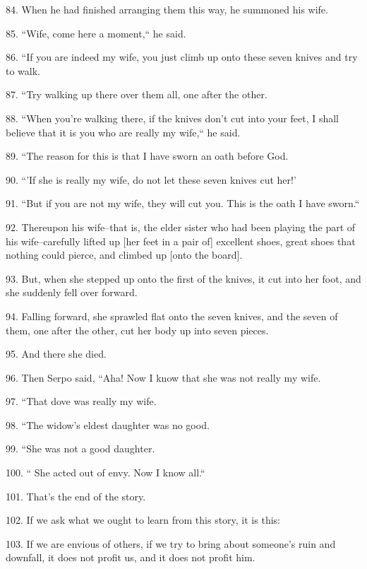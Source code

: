 {\LARGE{}84. When he had finished arranging them this way, he summoned his wife.
}

{\LARGE{}85. ``Wife, come here a moment,`` he said. }

{\LARGE{}86. ``If you are indeed my wife, you just climb up onto these
seven knives and try to walk. }

{\LARGE{}87. ``Try walking up there over them all, one after the other.
}

{\LARGE{}88. ``When you're walking there, if the knives don't cut into
your feet, I shall believe that it is you who are really my wife,`` he
said. }

{\LARGE{}89.  ``The reason for this is that I have sworn an oath before
God.}

{\LARGE{}90.  ``'If she is really my wife, do not let these seven knives
cut her!' }

{\LARGE{}91.  ``But if you are not my wife, they will cut you. This is
the oath I have sworn.`` }

{\LARGE{}92.  Thereupon his wife--that is, the elder sister who had been playing
the part of his wife--carefully lifted up [her feet in a pair of] excellent shoes,
great shoes that nothing could pierce, and climbed up [onto the board]. }

{\LARGE{}93.  But, when she stepped up onto the first of the knives, it cut into
her foot, and she suddenly fell over forward. }

{\LARGE{}94.  Falling forward, she sprawled flat onto the seven knives, and the
seven of them, one after the other, cut her body up into seven pieces. }

{\LARGE{}95.  And there she died. }

{\LARGE{}96.  Then Serpo said, ``Aha! Now I know that she was not really
my wife. }

{\LARGE{}97. ``That dove was really my wife. }

{\LARGE{}98.  ``The widow's eldest daughter was no good. }

{\LARGE{}99.  ``She was not a good daughter.}

{\LARGE{}100. `` She acted out of envy. Now I know all.`` }

{\LARGE{}101.  That's the end of the story.}

{\LARGE{}102. If we ask what we ought to learn from this story, it is this: }

{\LARGE{}103. If we are envious of others, if we try to bring about someone's ruin
and downfall, it does not profit us, and it does not profit him.}

